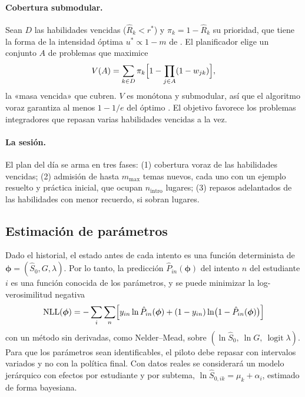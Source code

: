 \documentclass[12pt]{article}
\theoremstyle{definition}
\newcommand{\Rh}{\hat R}
\newcommand{\Sh}{\hat S}
\newcommand{\rstar}{r^{\ast}}
\begin{document}
\paragraph{Cobertura submodular.} Sean $D$ las habilidades vencidas ($\Rh_k<\rstar$) y $\pi_k=1-\Rh_k$ su prioridad, que tiene la forma de la intensidad óptima $u^\ast\propto1-m$ de \citet{tabibian2019}. El planificador elige un conjunto $A$ de problemas que maximice
\begin{equation}
V(A)=\sum_{k\in D}\pi_k\Bigl[1-\prod_{j\in A}(1-w_{jk})\Bigr],
\label{eq:cobertura}
\end{equation}
la «masa vencida» que cubren. $V$ es monótona y submodular, así que el algoritmo voraz garantiza al menos $1-1/e$ del óptimo \citep{nemhauser1978}. El objetivo favorece los problemas integradores que repasan varias habilidades vencidas a la vez.

\paragraph{La sesión.} El plan del día se arma en tres fases: (1) cobertura voraz de las habilidades vencidas; (2) admisión de hasta $m_{\max}$ temas nuevos, cada uno con un ejemplo resuelto y práctica inicial, que ocupan $n_{\mathrm{intro}}$ lugares; (3) repasos adelantados de las habilidades con menor recuerdo, si sobran lugares.

\subsection{Estimación de parámetros}
\label{sec:estimacion}

Dado el historial, el estado antes de cada intento es una función determinista de $\bm\phi=(\Sh_0,G,\lambda)$. Por lo tanto, la predicción $\hat P_{in}(\bm\phi)$ del intento $n$ del estudiante $i$ es una función conocida de los parámetros, y se puede minimizar la log-verosimilitud negativa
\begin{equation}
\mathrm{NLL}(\bm\phi)=-\sum_i\sum_n\Bigl[y_{in}\ln\hat P_{in}(\bm\phi)+(1-y_{in})\ln\bigl(1-\hat P_{in}(\bm\phi)\bigr)\Bigr]
\label{eq:nll}
\end{equation}
con un método sin derivadas, como Nelder--Mead, sobre $(\ln\Sh_0,\ \ln G,\ \operatorname{logit}\lambda)$. Para que los parámetros sean identificables, el piloto debe repasar con intervalos variados y no con la política final. Con datos reales se considerará un modelo jerárquico con efectos por estudiante y por subtema, $\ln\Sh_{0,ik}=\mu_k+\alpha_i$, estimado de forma bayesiana.
\end{document}
